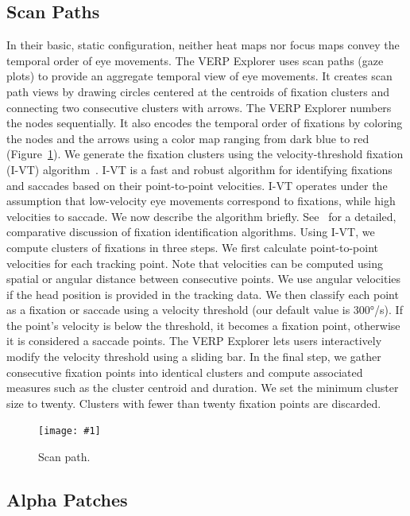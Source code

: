 \documentclass[journal]{vgtc}                %
\newcommand{\insertpicture}[2]{\begin{center}\texttt{[image: \#1]}\end{center}}
\begin{document}
\subsection{Scan Paths} 

In their basic, static configuration, neither heat
maps nor focus maps convey the temporal order of eye movements.  The VERP
Explorer uses scan paths (gaze plots) to provide an aggregate temporal view
of eye movements. It creates scan path views by drawing circles centered at
the centroids of fixation clusters and connecting two consecutive clusters
with arrows. The VERP Explorer numbers the nodes sequentially. It also
encodes the temporal order of fixations by coloring the nodes and the
arrows using a color map ranging from dark blue to red~\cite{Harrower_2003}
(Figure~\ref{fig:scanpath}).  We generate the fixation clusters using the velocity-threshold
fixation (I-VT) algorithm~\cite{Salvucci_2000}.  I-VT is a fast and robust
algorithm for identifying fixations and saccades based on their
point-to-point velocities.  I-VT operates under the assumption that
low-velocity eye movements correspond to fixations, while high velocities
to saccade. We now describe the algorithm briefly. See~\cite{Salvucci_2000}
for a detailed, comparative discussion of fixation identification
algorithms. Using I-VT, we compute clusters of fixations in three steps. We
first calculate point-to-point velocities for each tracking point.  Note
that velocities can be computed using spatial or angular distance between
consecutive points.  We use angular velocities if the head position is
provided in the tracking data. We then classify each point as a fixation or
saccade using a velocity threshold (our default value is 300°/s).  If the
point’s velocity is below the threshold, it becomes a fixation point,
otherwise it is considered a saccade points. The VERP Explorer lets users
interactively modify the velocity threshold using a sliding bar. In the
final step, we gather consecutive fixation points into identical clusters
and compute associated measures such as the cluster centroid and duration.
We set the minimum cluster size to twenty. Clusters with fewer than twenty
fixation points are discarded. 

\begin{figure}
\insertpicture{figures/scanpath.pdf}{0.5}
\caption{Scan path.\label{fig:scanpath}}
\end{figure}	

\subsection{Alpha Patches}
\end{document}

